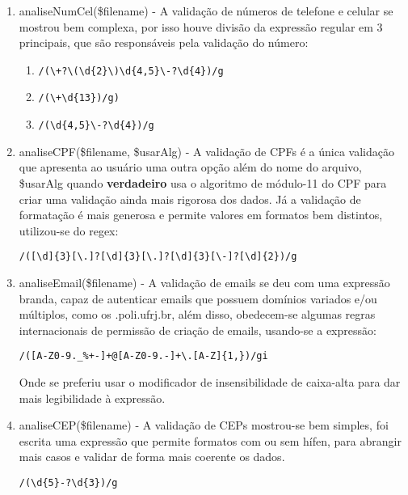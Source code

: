 \documentclass[paper=a4, fontsize=12pt]{scrartcl} %
\numberwithin{equation}{section} %
\numberwithin{figure}{section} %
\numberwithin{table}{section} %
\begin{document}
\begin{enumerate}
\item analiseNumCel(\$filename) - A validação de números de telefone e celular se mostrou bem complexa, por isso houve divisão da expressão regular em 3 principais, que são responsáveis pela validação do número:
\begin{enumerate}
\item 
\begin{verbatim} 
/(\+?\(\d{2}\)\d{4,5}\-?\d{4})/g  
\end{verbatim}
\item         
\begin{verbatim}
/(\+\d{13})/g)
\end{verbatim} 
\item 
\begin{verbatim}
/(\d{4,5}\-?\d{4})/g
\end{verbatim} 
\end{enumerate}

\item analiseCPF(\$filename, \$usarAlg) - A validação de CPFs é a única validação que apresenta ao usuário uma outra opção além do nome do arquivo, \$usarAlg quando \textbf{verdadeiro} usa o algoritmo de módulo-11 do CPF para criar uma validação ainda mais rigorosa dos dados. Já a validação de formatação é mais generosa e permite valores em formatos bem distintos, utilizou-se do regex:  \begin{verbatim}
/([\d]{3}[\.]?[\d]{3}[\.]?[\d]{3}[\-]?[\d]{2})/g
\end{verbatim}

\item analiseEmail(\$filename) - A validação de emails se deu com uma expressão branda, capaz de autenticar emails que possuem domínios variados e/ou múltiplos, como os .poli.ufrj.br, além disso, obedecem-se algumas regras internacionais de permissão de criação de emails, usando-se a expressão: \begin{verbatim}
/([A-Z0-9._%+-]+@[A-Z0-9.-]+\.[A-Z]{1,})/gi
\end{verbatim}
Onde se preferiu usar o modificador de insensibilidade de caixa-alta para dar mais legibilidade à expressão.

\item analiseCEP(\$filename) - A validação de CEPs mostrou-se bem simples, foi escrita uma expressão que permite formatos com ou sem hífen, para abrangir mais casos e validar de forma mais coerente os dados. \begin{verbatim}
/(\d{5}-?\d{3})/g
\end{verbatim}


\end{enumerate}
\end{document}
